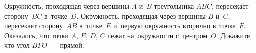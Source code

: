 \begin{problems}
\item
Окружность, проходящая через вершины $A$ и~$B$ треугольника $ABC$, пересекает
сторону~$BC$ в~точке~$D$.
Окружность, проходящая через вершины $B$ и~$C$, пересекает сторону~$AB$
в~точке~$E$ и~первую окружность вторично в~точке~$F$.
Оказалось, что точки $A$, $E$, $D$, $C$ лежат на~окружности с~центром~$O$.
Докажите, что угол $BFO$~--- прямой.

\end{problems}


